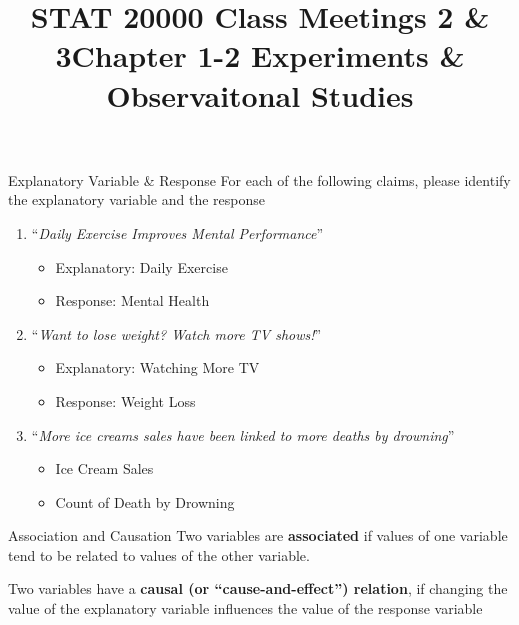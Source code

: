\documentclass[
  ignorenonframetext, 10pt
]{beamer}
\title{STAT 20000 Class Meetings 2 \& 3\newline Chapter 1-2 Experiments
\& Observaitonal Studies}
\author{}
\date{\vspace{-2.5em}}
\providecommand{\tightlist}{%
  \setlength{\itemsep}{0pt}\setlength{\parskip}{0pt}}
\begin{document}
\frame{\titlepage}

\begin{frame}{Explanatory Variable \& Response}
\protect\hypertarget{explanatory-variable-response}{}
For each of the following claims, please identify the explanatory
variable and the response

\begin{enumerate}
\tightlist
\item
  ``\textit{Daily Exercise Improves Mental Performance}''

  \begin{itemize}
  \tightlist
  \item
    Explanatory: Daily Exercise
  \item
    Response: Mental Health
  \end{itemize}
\item
  ``\textit{Want to lose weight? Watch more TV shows!}''

  \begin{itemize}
  \tightlist
  \item
    Explanatory: Watching More TV
  \item
    Response: Weight Loss
  \end{itemize}
\item
  ``\textit{More ice creams sales have been linked to more deaths by drowning}''

  \begin{itemize}
  \tightlist
  \item
    Ice Cream Sales
  \item
    Count of Death by Drowning
  \end{itemize}
\end{enumerate}
\end{frame}

\begin{frame}{Association and Causation}
\protect\hypertarget{association-and-causation}{}
Two variables are \textbf{associated} if values of one variable tend to
be related to values of the other variable. \bigskip

Two variables have a \textbf{causal (or ``cause-and-effect'') relation},
if changing the value of the explanatory variable influences the value
of the response variable
\end{frame}
\end{document}
